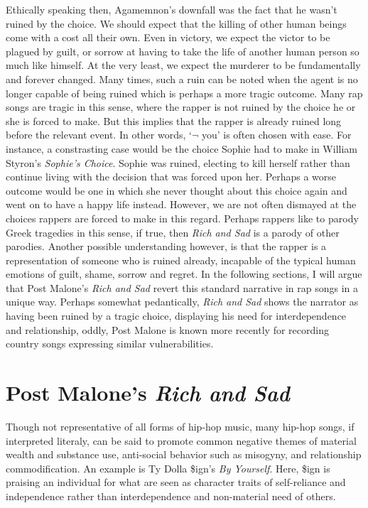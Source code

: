 \documentclass[12pt]{book}
\theoremstyle{definition}
\theoremstyle{remark}
\begin{document}
Ethically speaking then, Agamemnon's downfall was the fact that he wasn't ruined by the choice. We should expect that the killing of other human beings come with a cost all their own. Even in victory, we expect the victor to be plagued by guilt, or sorrow at having to take the life of another human person so much like himself. At the very least, we expect the murderer to be fundamentally and forever changed. Many times, such a ruin can be noted when the agent is no longer capable of being ruined which is perhaps a more tragic outcome. Many rap songs are tragic in this sense, where the rapper is not ruined by the choice he or she is forced to make. But this implies that the rapper is already ruined long before the relevant event. In other words, `\(\lnot\) you' is often chosen with ease. For instance, a constrasting case would be the choice Sophie had to make in William Styron's \emph{Sophie's Choice}. Sophie was ruined, electing to kill herself rather than continue living with the decision that was forced upon her. Perhaps a worse outcome would be one in which she never thought about this choice again and went on to have a happy life instead. However, we are not often dismayed at the choices rappers are forced to make in this regard. Perhaps rappers like to parody Greek tragedies in this sense, if true, then \emph{Rich and Sad} is a parody of other parodies. Another possible understanding however, is that the rapper is a representation of someone who is ruined already, incapable of the typical human emotions of guilt, shame, sorrow and regret. In the following sections, I will argue that Post Malone's \emph{Rich and Sad} revert this standard narrative in rap songs in a unique way. Perhaps somewhat pedantically, \emph{Rich and Sad} shows the narrator as having been ruined by a tragic choice, displaying his need for interdependence and relationship, oddly, Post Malone is known more recently for recording country songs expressing similar vulnerabilities.

\section{\texorpdfstring{Post Malone's \emph{Rich and Sad}}{Post Malone's Rich and Sad}}\label{post-malones-rich-and-sad}

Though not representative of all forms of hip-hop music, many hip-hop songs, if interpreted literaly, can be said to promote common negative themes of material wealth and substance use, anti-social behavior such as misogyny, and relationship commodification. An example is Ty Dolla \$ign's \emph{By Yourself}. Here, \$ign is praising an individual for what are seen as character traits of self-reliance and independence rather than interdependence and non-material need of others.
\end{document}
